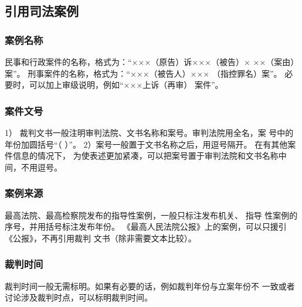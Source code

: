 \documentclass{article}
\begin{document}
\subsection{引用司法案例}

\subsubsection{案例名称}

民事和行政案件的名称，格式为：“×××（原告）诉×××（被告）×
××（案由）案”。 刑事案件的名称，格式为：“×××（被告人）×××
（指控罪名）案”。 必要时，可以加上审级说明，例如“×××上诉（再审）
案件”。

\subsubsection{案件文号}
1） 裁判文书一般注明审判法院、文书名称和案号。审判法院用全名，案
号中的年份加圆括号“（ ）”。 
2）案号一般置于文书名称之后，用逗号隔开。 在有其他案件信息的情况下，
为使表述更加紧凑，可以把案号置于审判法院和文书名称中间，不用逗号。

\begin{quotation}
\end{quotation}


\subsubsection{案例来源}
最高法院、最高检察院发布的指导性案例，一般只标注发布机关、 指导
性案例的序号，并用括号标注发布年份。
《最高人民法院公报》上的案例，可以只援引《公报》，不再引用裁判
文书（除非需要文本比较）。 
\begin{quotation}

\end{quotation}


\subsubsection{裁判时间}
裁判时间一般无需标明。如果有必要的话，例如裁判年份与立案年份不
一致或者讨论涉及裁判时点，可以标明裁判时间。

\begin{quotation}

\end{quotation}
\end{document}
